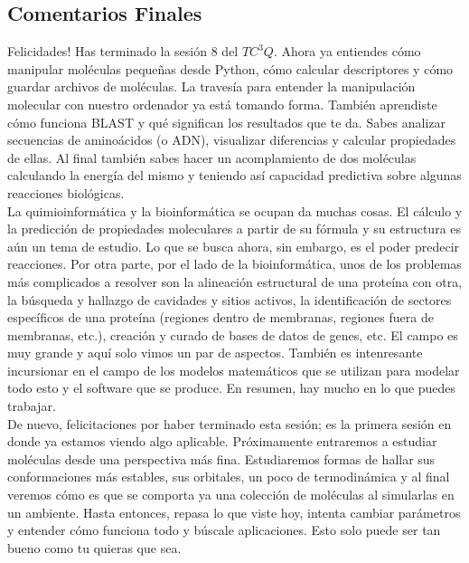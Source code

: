 \documentclass[10pt,letterpaper]{article}
\begin{document}
\subsection{Comentarios Finales}

Felicidades! Has terminado la sesi\'on 8 del $TC^3 Q$. Ahora ya entiendes c\'omo manipular mol\'eculas peque\~nas desde Python, c\'omo calcular descriptores y c\'omo guardar archivos de mol\'eculas. La traves\'ia para entender la manipulaci\'on molecular con nuestro ordenador ya est\'a tomando forma. Tambi\'en aprendiste c\'omo funciona BLAST y qu\'e significan los resultados que te da. Sabes analizar secuencias de amino\'acidos (o ADN), visualizar diferencias y calcular propiedades de ellas. Al final tambi\'en sabes hacer un acomplamiento de dos mol\'eculas calculando la energ\'ia del mismo y teniendo as\'i capacidad predictiva sobre algunas reacciones biol\'ogicas.\\

La quimioinform\'atica y la bioinform\'atica se ocupan da muchas cosas. El c\'alculo y la predicci\'on de propiedades moleculares a partir de su f\'ormula y su estructura es a\'un un tema de estudio. Lo que se busca ahora, sin embargo, es el poder predecir reacciones. Por otra parte, por el lado de la bioinform\'atica, unos de los problemas m\'as complicados a resolver son la alineaci\'on estructural de una prote\'ina con otra, la b\'usqueda y hallazgo de cavidades y sitios activos, la identificaci\'on de sectores espec\'ificos de una prote\'ina (regiones dentro de membranas, regiones fuera de membranas, etc.), creaci\'on y curado de bases de datos de genes, etc. El campo es muy grande y aqu\'i solo vimos un par de aspectos. Tambi\'en es intenresante incursionar en el campo de los modelos matem\'aticos que se utilizan para modelar todo esto y el software que se produce. En resumen, hay mucho en lo que puedes trabajar.\\

De nuevo, felicitaciones por haber terminado esta sesi\'on; es la primera sesi\'on en donde ya estamos viendo algo aplicable. Pr\'oximamente entraremos a estudiar mol\'eculas desde una perspectiva m\'as fina. Estudiaremos formas de hallar sus conformaciones m\'as estables, sus orbitales, un poco de termodin\'amica y al final veremos c\'omo es que se comporta ya una colecci\'on de mol\'eculas al simularlas en un ambiente. Hasta entonces, repasa lo que viste hoy, intenta cambiar par\'ametros y entender c\'omo funciona todo y b\'uscale aplicaciones. Esto solo puede ser tan bueno como tu quieras que sea.
\end{document}

